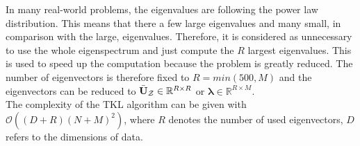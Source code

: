 In many real-world problems, the eigenvalues are following the power law distribution.
This means that there a few large eigenvalues and many small, in comparison with the large, eigenvalues.\cite{Mihail.2002}
Therefore, it is considered as unnecessary to use the whole eigenspectrum and just compute the $R$ largest eigenvalues.
This is used to speed up the computation because the problem is greatly reduced.
The number of eigenvectors is therefore fixed to $R=min(500,M)$ and the eigenvectors can be reduced to $\bar{\mathbf{U}}_\mathcal{Z} \in \mathbb{R}^{R\times R}$ or $\mathbf{\lambda} \in \mathbb{R}^{R\times M}$.\cite{Long.}\\
The complexity of the \acs{TKL} algorithm can be given with $\mathcal{O}((D+R)(N+M)^2)$, where $R$ denotes the number of used eigenvectors, $D$ refers to the dimensions of data.\cite{Long.}
